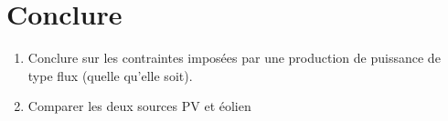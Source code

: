 \documentclass[12pt,a4,french]{article}
\begin{document}
\section{Conclure}
\begin{enumerate}
	\item Conclure sur les contraintes imposées par une production de puissance de type flux (quelle qu'elle soit). 
	
	\item Comparer les deux  sources PV et éolien
\end{enumerate}
\end{document}
